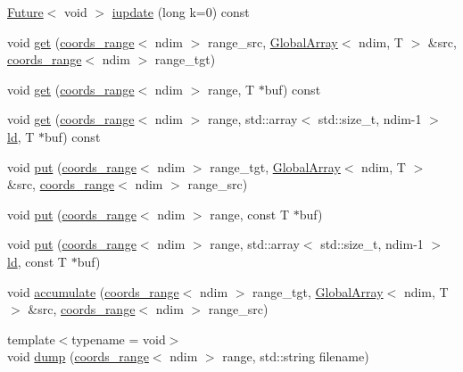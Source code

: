 \begin{DoxyCompactItemize}
\begin{DoxyCompactList}
 \end{DoxyCompactList}\item 
\hyperlink{structshark_1_1_future}{Future}$<$ void $>$ \hyperlink{classshark_1_1ndim_1_1_global_array_a6485a70dbb541c3bc600fb96903169ef}{iupdate} (long k=0) const
\item 
void \hyperlink{classshark_1_1ndim_1_1_global_array_ac7949ae0526bc0a8ca3b7a3561a3b788}{get} (\hyperlink{structshark_1_1ndim_1_1coords__range}{coords\+\_\+range}$<$ ndim $>$ range\+\_\+src, \hyperlink{classshark_1_1ndim_1_1_global_array}{Global\+Array}$<$ ndim, T $>$ \&src, \hyperlink{structshark_1_1ndim_1_1coords__range}{coords\+\_\+range}$<$ ndim $>$ range\+\_\+tgt)
\item 
void \hyperlink{classshark_1_1ndim_1_1_global_array_a655f6da8e7f336f63669a0008f324e36}{get} (\hyperlink{structshark_1_1ndim_1_1coords__range}{coords\+\_\+range}$<$ ndim $>$ range, T $\ast$buf) const
\item 
void \hyperlink{classshark_1_1ndim_1_1_global_array_a7df181f976618d26c70d6a2b364ab459}{get} (\hyperlink{structshark_1_1ndim_1_1coords__range}{coords\+\_\+range}$<$ ndim $>$ range, std\+::array$<$ std\+::size\+\_\+t, ndim-\/1 $>$ \hyperlink{classshark_1_1ndim_1_1_global_array_afdc4665e0fde4a703785436af351df49}{ld}, T $\ast$buf) const
\item 
void \hyperlink{classshark_1_1ndim_1_1_global_array_a243017e228365f73049fdb7136bb40a6}{put} (\hyperlink{structshark_1_1ndim_1_1coords__range}{coords\+\_\+range}$<$ ndim $>$ range\+\_\+tgt, \hyperlink{classshark_1_1ndim_1_1_global_array}{Global\+Array}$<$ ndim, T $>$ \&src, \hyperlink{structshark_1_1ndim_1_1coords__range}{coords\+\_\+range}$<$ ndim $>$ range\+\_\+src)
\item 
void \hyperlink{classshark_1_1ndim_1_1_global_array_a068b9c1fc5d00815b8be060454e14d6d}{put} (\hyperlink{structshark_1_1ndim_1_1coords__range}{coords\+\_\+range}$<$ ndim $>$ range, const T $\ast$buf)
\item 
void \hyperlink{classshark_1_1ndim_1_1_global_array_a078514cc8388c3c48964b958d2ff5dc7}{put} (\hyperlink{structshark_1_1ndim_1_1coords__range}{coords\+\_\+range}$<$ ndim $>$ range, std\+::array$<$ std\+::size\+\_\+t, ndim-\/1 $>$ \hyperlink{classshark_1_1ndim_1_1_global_array_afdc4665e0fde4a703785436af351df49}{ld}, const T $\ast$buf)
\item 
void \hyperlink{classshark_1_1ndim_1_1_global_array_a56bc7c60d0516eedcdc4be9c88bdba11}{accumulate} (\hyperlink{structshark_1_1ndim_1_1coords__range}{coords\+\_\+range}$<$ ndim $>$ range\+\_\+tgt, \hyperlink{classshark_1_1ndim_1_1_global_array}{Global\+Array}$<$ ndim, T $>$ \&src, \hyperlink{structshark_1_1ndim_1_1coords__range}{coords\+\_\+range}$<$ ndim $>$ range\+\_\+src)
\item 
{\footnotesize template$<$typename  = void$>$ }\\void \hyperlink{classshark_1_1ndim_1_1_global_array_a2afde2694e3e5a09dc1f782b5f0f3b82}{dump} (\hyperlink{structshark_1_1ndim_1_1coords__range}{coords\+\_\+range}$<$ ndim $>$ range, std\+::string filename)
\end{DoxyCompactItemize}

